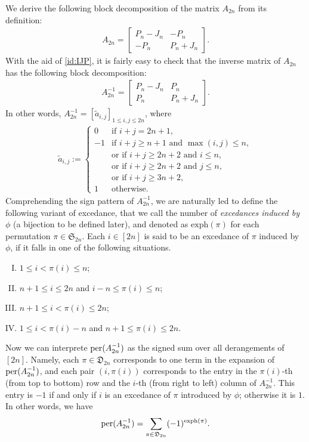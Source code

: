\documentclass[11pt,reqno]{amsart}
\numberwithin{equation}{section}
\theoremstyle{plain}
\theoremstyle{definition}
\renewcommand{\S}{\mathfrak{S}}
\def\per{\mathrm{per}}
\def\exph{\mathrm{exph}}
\newcommand{\D}{\mathfrak{D}}
\def\per{{\rm per}}
\begin{document}
We derive the following block decomposition of the matrix $A_{2n}$ from its definition:
\begin{align*}
A_{2n}=\begin{bmatrix}
P_n-J_n & -P_n \\
-P_n & P_n+J_n
\end{bmatrix}.
\end{align*}
 With the aid of \eqref{id:IJP}, it is fairly easy to check that the inverse matrix of $A_{2n}$ has the following block decomposition:
\begin{align*}
A^{-1}_{2n}=\begin{bmatrix}
P_n-J_n & P_n \\
P_n & P_n+J_n
\end{bmatrix}.
\end{align*}
In other words, $A^{-1}_{2n}=[\tilde{a}_{i,j}]_{1\le i,j\le 2n}$, where
\begin{align*}
\tilde{a}_{i,j}:=\begin{cases}
0 & \text{if $i+j=2n+1$},\\
-1 & \text{if $i+j\ge n+1$ and $\max(i,j)\le n$},\\
 & \text{or if $i+j\ge 2n+2$ and $i\le n$},\\
 & \text{or if $i+j\ge 2n+2$ and $j\le n$},\\
 & \text{or if $i+j\ge 3n+2$},\\
1 & \text{otherwise}.
\end{cases}
\end{align*}
Comprehending the sign pattern of $A^{-1}_{2n}$, we are naturally led to define the following variant of excedance, that we call the number of {\it excedances induced by $\phi$} (a bijection to be defined later), and denoted as $\exph(\pi)$ for each permutation $\pi\in\S_{2n}$. Each $i\in[2n]$ is said to be an excedance of $\pi$ induced by $\phi$, if it falls in one of the following situations.
\begin{enumerate}[I.]
  \item $1\le i<\pi(i)\le n$;
  \item $n+1\le i\le 2n$ and $i-n\le \pi(i)\le n$;
  \item $n+1\le i<\pi(i)\le 2n$;
  \item $1\le i<\pi(i)-n$ and $n+1\le \pi(i)\le 2n$.
\end{enumerate}

Now we can interprete $\per(A_{2n}^{-1})$ as the signed sum over all derangements of $[2n]$. Namely, each $\pi\in\D_{2n}$ corresponds to one term in the expansion of $\per(A_{2n}^{-1})$, and each pair $(i,\pi(i))$ corresponds to the entry in the $\pi(i)$-th (from top to bottom) row and the $i$-th (from right to left) column of $A_{2n}^{-1}$. This entry is $-1$ if and only if $i$ is an excedance of $\pi$ introduced by $\phi$; otherwise it is $1$. In other words, we have
\begin{align}\label{id:per=exph over der}
\per(A_{2n}^{-1})=\sum_{\pi\in\D_{2n}}(-1)^{\exph(\pi)}.
\end{align}
\end{document}
